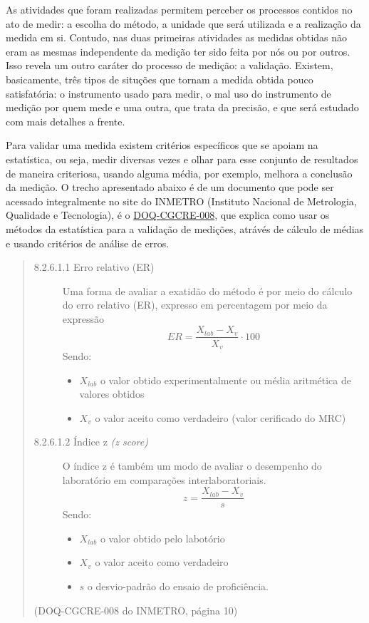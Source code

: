 As atividades que foram realizadas permitem perceber os processos contidos no ato de medir: a escolha do método, a unidade que será utilizada e a realização da medida em si. Contudo, nas duas primeiras atividades as medidas obtidas não eram as mesmas independente da medição ter sido feita por nós ou por outros. Isso revela um outro caráter do processo de medição: a validação. Existem, basicamente, três tipos de situções que tornam a medida obtida pouco satisfatória: o instrumento usado para medir, o mal uso do instrumento de medição por quem mede e uma outra, que trata da precisão, e que será estudado com mais detalhes a frente.

Para validar uma medida existem critérios específicos que se apoiam na estatística, ou seja, medir diversas vezes e olhar para esse conjunto de resultados de maneira criteriosa, usando alguma média, por exemplo, melhora a conclusão da medição. O trecho apresentado abaixo é de um documento que pode ser acessado integralmente no site do INMETRO (Instituto Nacional de Metrologia, Qualidade e Tecnologia), é o \href{http://www.inmetro.gov.br/Sidoq/Arquivos/Cgcre/DOQ/DOQ-Cgcre-8\_04.pdf}{DOQ-CGCRE-008}, que explica como usar os métodos da estatística  para a validação de medições, atrávés de cálculo de médias e usando critérios de análise de erros.
\begin{quote}
\begin{description}
	\item[8.2.6.1.1 Erro relativo (ER)] Uma forma de avaliar a exatidão do método é por meio do cálculo do erro relativo (ER), expresso em percentagem por meio da expressão
	\begin{equation*}
		ER=\frac{X_{lab}-X_v}{X_v}\cdot100
	\end{equation*}
	Sendo:
	\begin{itemize}
		\item $X_{lab}$ o valor obtido experimentalmente ou média aritmética de valores obtidos
		\item $X_v$ o valor aceito como verdadeiro (valor cerificado do MRC)
	\end{itemize}
	\item[8.2.6.1.2 Índice z \textit{(z score)}] O índice z é também um modo de avaliar o desempenho do laboratório em comparações interlaboratoriais.
	\begin{equation*}
		z=\frac{X_{lab}-X_v}{s}
	\end{equation*}
	Sendo:
	\begin{itemize}
		\item $X_{lab}$ o valor obtido pelo labotório
		\item $X_v$ o valor aceito como verdadeiro
		\item $s$ o desvio-padrão do ensaio de proficiência.
	\end{itemize}
\end{description}
\flushright (DOQ-CGCRE-008 do INMETRO, página 10)
\end{quote}

